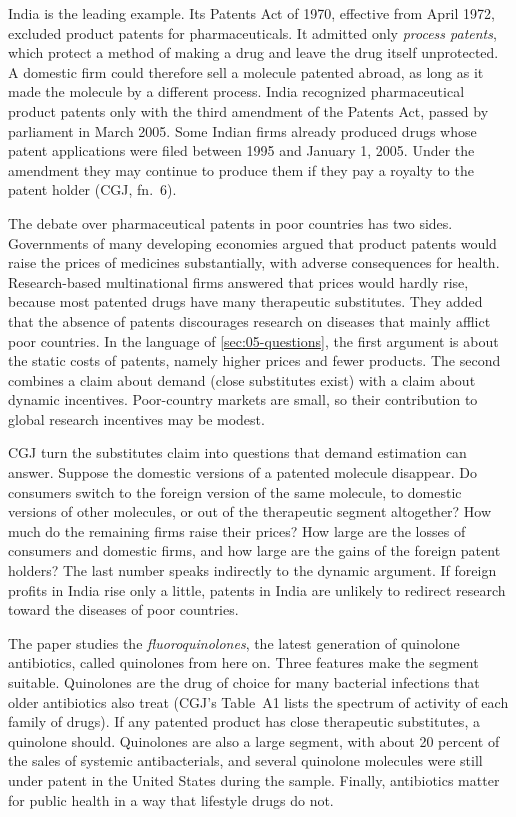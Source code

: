 India is the leading example. Its Patents Act of 1970, effective from April 1972, excluded product patents for
pharmaceuticals. It admitted only \emph{process patents}, which protect a method of making a drug and leave the drug
itself unprotected. A domestic firm could therefore sell a molecule patented abroad, as long as it made the molecule
by a different process. India recognized pharmaceutical product patents only with the third amendment of the Patents
Act, passed by parliament in March 2005. Some Indian firms already produced drugs whose patent applications were
filed between 1995 and January 1, 2005. Under the amendment they may continue to produce them if they pay a royalty
to the patent holder (CGJ, fn.~6).

The debate over pharmaceutical patents in poor countries has two sides. Governments of many developing economies
argued that product patents would raise the prices of medicines substantially, with adverse consequences for health.
Research-based multinational firms answered that prices would hardly rise, because most patented drugs have many
therapeutic substitutes. They added that the absence of patents discourages research on diseases that mainly afflict
poor countries. In the language of \cref{sec:05-questions}, the first argument is about the static costs of patents,
namely higher prices and fewer products. The second combines a claim about demand (close substitutes exist) with a
claim about dynamic incentives. Poor-country markets are small, so their contribution to global research incentives
may be modest.

CGJ turn the substitutes claim into questions that demand estimation can answer. Suppose the domestic versions of a
patented molecule disappear. Do consumers switch to the foreign version of the same molecule, to domestic versions of
other molecules, or out of the therapeutic segment altogether? How much do the remaining firms raise their prices?
How large are the losses of consumers and domestic firms, and how large are the gains of the foreign patent holders?
The last number speaks indirectly to the dynamic argument. If foreign profits in India rise only a little, patents in
India are unlikely to redirect research toward the diseases of poor countries.

The paper studies the \emph{fluoroquinolones}, the latest generation of quinolone antibiotics, called quinolones from
here on. Three features make the segment suitable. Quinolones are the drug of choice for many bacterial infections
that older antibiotics also treat (CGJ's Table~A1 lists the spectrum of activity of each family of drugs). If any
patented product has close therapeutic substitutes, a quinolone should. Quinolones are also a large segment, with
about 20 percent of the sales of systemic antibacterials, and several quinolone molecules were still under patent in
the United States during the sample. Finally, antibiotics matter for public health in a way that lifestyle drugs do
not.

